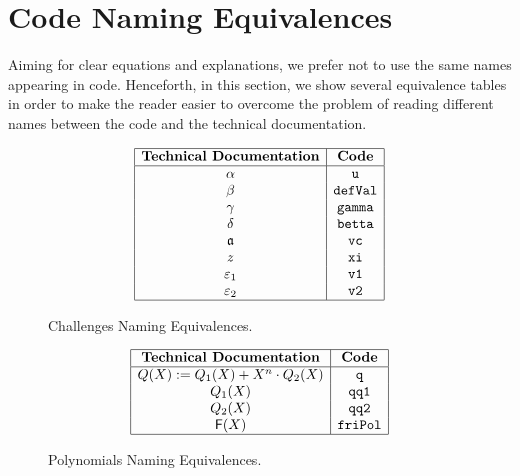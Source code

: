 
\section{Code Naming Equivalences}

Aiming for clear equations and explanations, we prefer not to use the same names appearing in code. Henceforth, in this section, we show several equivalence tables in order to make the reader easier to overcome the problem of reading different names between the code and the technical documentation. 

\begin{figure}[H]
\[
\begin{array}{|c|c|}
\hline
\textbf{Technical Documentation}	&\textbf{Code}  	\\ \hline
\alpha								&\texttt{u}			\\  
\beta								&\texttt{defVal}	\\
\gamma								&\texttt{gamma}		\\
\delta								&\texttt{betta}		\\
\mathfrak{a}								&\texttt{vc}		\\
z									&\texttt{xi}		\\
\varepsilon_1							&\texttt{v1}		\\
\varepsilon_2							&\texttt{v2}		\\
\hline
\end{array}
\]
\caption{Challenges Naming Equivalences. }
\end{figure}




\begin{figure}[H]
\[
\begin{array}{|c|c|}
\hline
\textbf{Technical Documentation}	&\textbf{Code}  	\\ \hline
Q(X) := Q_1(X) + X^n \cdot Q_2(X)	&\texttt{q}			\\  
Q_1(X)								&\texttt{qq1}		\\
Q_2(X)								&\texttt{qq2}		\\
\textsf{F}(X)								&\texttt{friPol}	\\
\hline
\end{array}
\]
\caption{Polynomials Naming Equivalences. }
\end{figure}